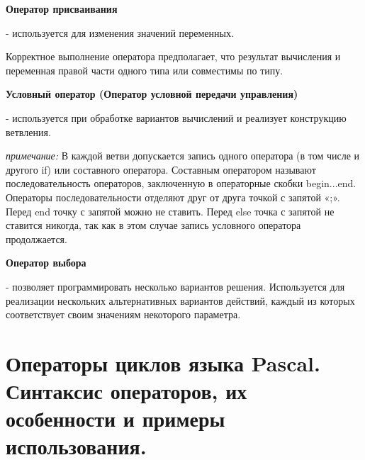 \begin{myquote}
        
\end{myquote}

{\bf{Оператор присваивания}}

- используется для изменения значений переменных.

Корректное выполнение оператора предполагает, что результат вычисления и переменная правой части одного типа или совместимы по типу.


{\bf{Условный оператор (Оператор условной передачи управления)}}

- используется при обработке вариантов вычислений и реализует конструкцию ветвления.


{\textit{примечание:}}
В каждой ветви допускается запись одного оператора (в том числе и другого if) или составного оператора. 
Составным оператором называют последовательность 
операторов, заключенную в операторные скобки begin...end. Операторы последовательности отделяют друг от друга точкой с запятой «;». Перед end 
точку с запятой можно не ставить. Перед else точка с запятой не ставится 
никогда, так как в этом случае запись условного оператора продолжается.

{\bf{Оператор выбора}}

- позволяет программировать несколько вариантов решения. Используется для реализации нескольких альтернативных вариантов действий, каждый из которых соответствует своим значениям некоторого параметра.







\newpage\section{Операторы циклов языка Pascal. Синтаксис операторов, их особенности и примеры использования. }

\begin{myquote}
        
\end{myquote}

